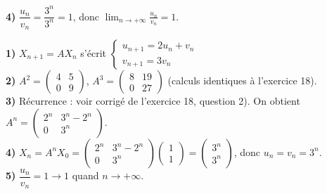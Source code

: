 \textbf{4)} $\dfrac{u_n}{v_n}=\dfrac{3^n}{3^n}=1$, donc $\displaystyle\lim_{n\to+\infty}\frac{u_n}{v_n}=1$.

\textbf{1)} $X_{n+1}=AX_n$ s'écrit $\left\{\begin{array}{l}u_{n+1}=2u_n+v_n\\ v_{n+1}=3v_n\end{array}\right.$\\
\textbf{2)} $A^2=\begin{pmatrix}4&5\\0&9\end{pmatrix}$, $A^3=\begin{pmatrix}8&19\\0&27\end{pmatrix}$
(calculs identiques à l'exercice 18).\\
\textbf{3)} Récurrence : voir corrigé de l'exercice 18, question 2). On obtient
$A^n=\begin{pmatrix}2^n&3^n-2^n\\0&3^n\end{pmatrix}$.\\
\textbf{4)} $X_n=A^nX_0=\begin{pmatrix}2^n&3^n-2^n\\0&3^n\end{pmatrix}\begin{pmatrix}1\\1\end{pmatrix}
=\begin{pmatrix}3^n\\3^n\end{pmatrix}$, donc $u_n=v_n=3^n$.\\
\textbf{5)} $\dfrac{u_n}{v_n}=1\to1$ quand $n\to+\infty$.

